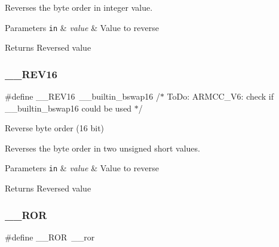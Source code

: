Reverses the byte order in integer value. 
\begin{DoxyParams}[1]{Parameters}
\mbox{\tt in}  & {\em value} & Value to reverse \\
\hline
\end{DoxyParams}
\begin{DoxyReturn}{Returns}
Reversed value 
\end{DoxyReturn}
\mbox{\label{group___c_m_s_i_s___core___instruction_interface_ga4e3acd41e7667cdf65ffcd8c76a8613f}} 
\subsubsection{\texorpdfstring{\+\_\+\+\_\+\+R\+E\+V16}{\_\_REV16}}
{\footnotesize\ttfamily \#define \+\_\+\+\_\+\+R\+E\+V16~\+\_\+\+\_\+builtin\+\_\+bswap16                           /$\ast$ To\+Do\+:  A\+R\+M\+C\+C\+\_\+\+V6\+: check if \+\_\+\+\_\+builtin\+\_\+bswap16 could be used $\ast$/}



Reverse byte order (16 bit) 

Reverses the byte order in two unsigned short values. 
\begin{DoxyParams}[1]{Parameters}
\mbox{\tt in}  & {\em value} & Value to reverse \\
\hline
\end{DoxyParams}
\begin{DoxyReturn}{Returns}
Reversed value 
\end{DoxyReturn}
\mbox{\label{group___c_m_s_i_s___core___instruction_interface_ga95b9bd281ddeda378b85afdb8f2ced86}} 
\subsubsection{\texorpdfstring{\+\_\+\+\_\+\+R\+OR}{\_\_ROR}}
{\footnotesize\ttfamily \#define \+\_\+\+\_\+\+R\+OR~\+\_\+\+\_\+ror}



